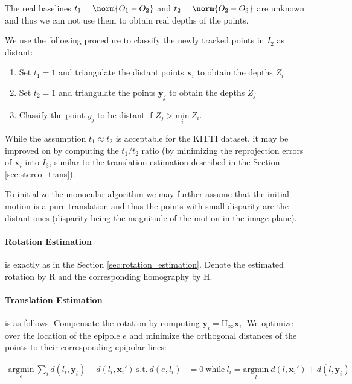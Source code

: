 The real baselines $t_1=\norm{O_1-O_2}$ and $t_2=\norm{O_2-O_3}$ are
unknown and thus we can not use them to obtain real depths of the
points.

We use the following procedure to classify the newly tracked points in
$I_2$ as distant:
\begin{enumerate}
\item Set $t_1=1$ and triangulate the distant points $\mathbf{x}_i$ to
  obtain the depths $Z_i$
\item Set $t_2=1$ and triangulate the points $\mathbf{y}_j$ to obtain
  the depths $Z_j$
\item Classify the point $y_j$ to be distant if
  $Z_j>\underset{i}{\text{min}}\ Z_i$.
\end{enumerate}

While the assumption $t_1 \approx t_2$ is acceptable for the KITTI
dataset, it may be improved on by computing the $t_1/t_2$ ratio (by
minimizing the reprojection errors of $\mathbf{x}_i$ into $I_3$,
similar to the translation estimation described in the Section
\ref{sec:stereo_trans}).

To initialize the monocular algorithm we may further assume that the
initial motion is a pure translation and thus the points with small
disparity are the distant ones (disparity being the magnitude of the
motion in the image plane).

\paragraph{Rotation Estimation} is exactly as in the Section 
\ref{sec:rotation_estimation}. Denote the estimated rotation by
$\mathrm{R}$ and the corresponding homography by $\mathrm{H}$.

\paragraph{Translation Estimation} is as follows. Compensate the
rotation by computing $\mathbf{y}_i = \mathrm{H_\infty}\mathbf{x}_i$.  We optimize over the location of
the epipole $e$ and minimize the orthogonal distances of the points to
their corresponding epipolar lines:

\begin{align}
  \underset{e}{\text{argmin}}\ \sum_i{d(l_i,\mathbf{y}_i)+d(l_i,\mathbf{x}_i')}\ \text{s.t.}\  d(e,l_i) & =0\ \text{while}\ l_i = \underset{l}{\text{argmin}}\ d(l,\mathbf{x}_i') + d(l,\mathbf{y}_i)
\end{align}

